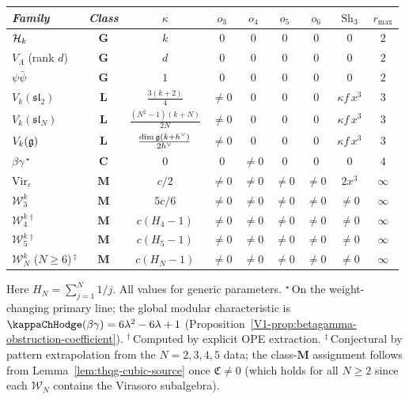\begin{theorem}
\ClaimStatusProvedHere
{}
\begin{center}
\footnotesize
\renewcommand{\arraystretch}{1.4}
\begin{tabular}{l@{\;\;}c@{\;\;}c@{\;\;}c@{\;\;}c@{\;\;}c@{\;\;}c@{\;\;}c@{\;\;}c}
\toprule
\emph{Family} & \emph{Class} & $\kappa$ &
 $o_3$ & $o_4$ & $o_5$ & $o_6$ &
 $\mathrm{Sh}_3$ & $r_{\max}$ \\
\midrule
$\mathcal{H}_k$ &
 $\mathbf{G}$ & $k$ &
 $0$ & $0$ & $0$ & $0$ & $0$ & $2$ \\
$V_\Lambda$ (rank $d$) &
 $\mathbf{G}$ & $d$ &
 $0$ & $0$ & $0$ & $0$ & $0$ & $2$ \\
$\psi\bar\psi$ &
 $\mathbf{G}$ & $1$ &
 $0$ & $0$ & $0$ & $0$ & $0$ & $2$ \\[2pt]
$V_k(\mathfrak{sl}_2)$ &
 $\mathbf{L}$ & $\frac{3(k+2)}{4}$ &
 $\neq 0$ & $0$ & $0$ & $0$ &
 $\kappa f\,x^3$ & $3$ \\
$V_k(\mathfrak{sl}_N)$ &
 $\mathbf{L}$ & $\frac{(N^2{-}1)(k+N)}{2N}$ &
 $\neq 0$ & $0$ & $0$ & $0$ &
 $\kappa f\,x^3$ & $3$ \\
$V_k(\mathfrak{g})$ &
 $\mathbf{L}$ & $\frac{\dim\mathfrak{g}(k+h^\vee)}{2h^\vee}$ &
 $\neq 0$ & $0$ & $0$ & $0$ &
 $\kappa f\,x^3$ & $3$ \\[2pt]
$\beta\gamma$\,$^\star$ &
 $\mathbf{C}$ & $0$ &
 $0$ & $\neq 0$ & $0$ & $0$ &
 $0$ & $4$ \\[2pt]
$\mathrm{Vir}_c$ &
 $\mathbf{M}$ & $c/2$ &
 $\neq 0$ & $\neq 0$ & $\neq 0$ & $\neq 0$ &
 $2x^3$ & $\infty$ \\
$\mathcal{W}_3^k$ &
 $\mathbf{M}$ & $5c/6$ &
 $\neq 0$ & $\neq 0$ & $\neq 0$ & $\neq 0$ &
 $\neq 0$ & $\infty$ \\
$\mathcal{W}_4^k$\,$^\dagger$ &
 $\mathbf{M}$ & $c(H_4{-}1)$ &
 $\neq 0$ & $\neq 0$ & $\neq 0$ & $\neq 0$ &
 $\neq 0$ & $\infty$ \\
$\mathcal{W}_5^k$\,$^\dagger$ &
 $\mathbf{M}$ & $c(H_5{-}1)$ &
 $\neq 0$ & $\neq 0$ & $\neq 0$ & $\neq 0$ &
 $\neq 0$ & $\infty$ \\
$\mathcal{W}_N^k$ ($N \geq 6$)\,$^\ddagger$ &
 $\mathbf{M}$ & $c(H_N{-}1)$ &
 $\neq 0$ & $\neq 0$ & $\neq 0$ & $\neq 0$ &
 $\neq 0$ & $\infty$ \\
\bottomrule
\end{tabular}
\end{center}
Here $H_N = \sum_{j=1}^N 1/j$. All values for generic parameters.
${}^\star$\,On the weight-changing primary line; the global
modular characteristic is $\kappaChHodge(\beta\gamma) = 6\lambda^2 - 6\lambda + 1$
(Proposition~\ref{V1-prop:betagamma-obstruction-coefficient}).
${}^\dagger$\,Computed by explicit OPE extraction.
${}^\ddagger$\,Conjectural by pattern extrapolation from
the $N = 2, 3, 4, 5$ data; the class-$\mathbf{M}$ assignment
follows from Lemma~\ref{lem:thqg-cubic-source} once
$\mathfrak{C} \neq 0$ (which holds for all $N \geq 2$
since each $\mathcal{W}_N$ contains the Virasoro subalgebra).
\end{theorem}


